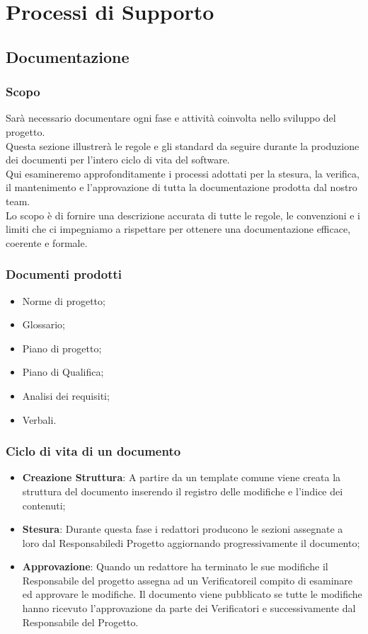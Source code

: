 \section{Processi di Supporto}\label{sup}

\subsection{Documentazione}
\subsubsection{Scopo}
Sarà necessario documentare ogni fase e attività coinvolta nello sviluppo del progetto.\\
Questa sezione illustrerà le regole e gli standard da seguire durante la produzione 
dei documenti per l'intero ciclo di vita del software. \\
Qui esamineremo approfonditamente i processi adottati per la stesura, la verifica\glo, il mantenimento e l’approvazione di tutta la documentazione prodotta dal nostro team. \\
Lo scopo è di fornire una descrizione accurata di tutte le regole, le convenzioni e i limiti che ci impegniamo a rispettare per ottenere una documentazione efficace, coerente e formale.\\

\subsubsection{Documenti prodotti}
\begin{itemize}
    \item Norme di progetto;
    \item Glossario;
    \item Piano di progetto;
    \item Piano di Qualifica;
    \item Analisi dei requisiti;
    \item Verbali.
\end{itemize}

\subsubsection{Ciclo di vita di un documento}
\begin{itemize}
    \item \textbf{Creazione Struttura}: A partire da un template comune viene creata la struttura del documento inserendo il registro delle modifiche e l’indice dei contenuti;
    \item \textbf{Stesura}: Durante questa fase i redattori producono le sezioni assegnate a loro dal Responsabile\glo di Progetto aggiornando progressivamente il documento;
    \item \textbf{Approvazione}: Quando un redattore ha terminato le sue modifiche il Responsabile del progetto assegna ad un Verificatore\glo il compito di esaminare ed approvare le modifiche.
Il documento viene pubblicato se tutte le modifiche hanno ricevuto l’approvazione da parte dei Verificatori e successivamente dal Responsabile del Progetto.
\end{itemize}

